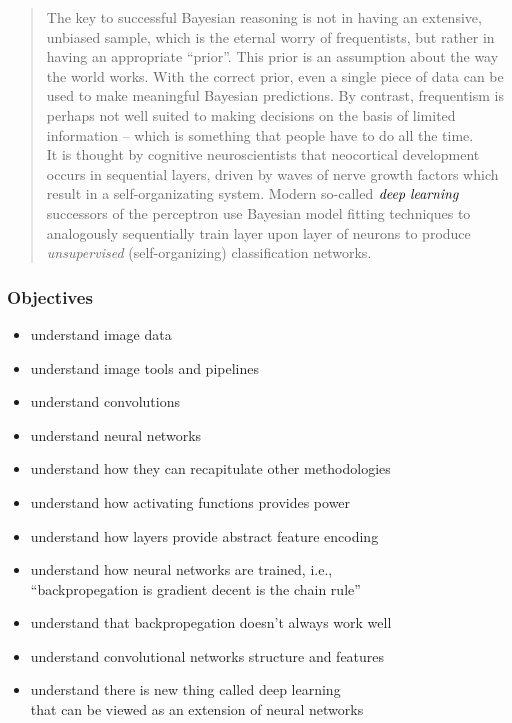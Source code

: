 \documentclass[xcolor={dvipsnames}]{beamer}
\begin{document}
{{{\begin{quote}
The key to successful Bayesian reasoning is not in having an extensive, unbiased sample, which is the eternal worry of frequentists, but rather in having an appropriate ``prior''. This prior is an assumption about the way the world works. 
With the correct prior, even a single piece of data can be used to make meaningful Bayesian predictions. By contrast, 
frequentism is perhaps not well suited to making decisions on the basis of limited information -- which is something that people have to do all the time.  \\
\hspace{1.5em} It is thought by cognitive neuroscientists that neocortical development occurs in sequential layers, driven by waves of nerve growth factors which result in a self-organizating system. 
Modern so-called $\textrm{\emph{deep learning}}$ successors of the perceptron use
 Bayesian model fitting techniques to analogously sequentially train layer upon layer of neurons 
to produce \emph{unsupervised} (self-organizing) classification networks. 


\end{quote}
}
}
}

\frame
{
 \frametitle{Objectives}

\begin{itemize}
\item understand image data
\item understand image tools and pipelines
\item understand convolutions
\item understand neural networks
\item understand how they can recapitulate other methodologies
\item understand how activating functions provides power 
\item understand how layers provide abstract feature encoding
\item understand how neural networks are trained, i.e., \\``backpropegation is gradient decent is the chain rule'' 
\item understand that backpropegation doesn't always work well
\item understand convolutional networks structure and features
\item understand there is new thing called deep learning\\
that can be viewed as an extension of neural networks
\end{itemize}

}
\end{document}
